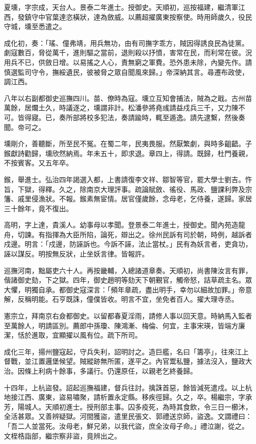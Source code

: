\begin{pinyinscope}
夏壎，字宗成，天台人。景泰二年進士。授御史。天順初，巡按福建，繼清軍江西，發鎮守中官葉達恣橫狀，達為斂威。以薦超擢廣東按察使。時用師歲久，役民守城，壎至悉遣之。

成化初，奏：「瑤、僮弗靖，用兵無功，由有司撫字乖方，賊因得誘良民為徒黨。劇寇數百，脅從萬千，進則驅之當前，退則殺以抒憤，害常在民，而利常在彼。況用兵不已，供斂日增。以易搖之人心，責無窮之軍費。恐外患未除，內變先作。請慎選監司守令，撫綏遺民，彼被脅之眾自聞風來歸。」帝深納其言。尋遷布政使，調江西。

八年以右副都御史巡撫四川。苗、僚時為寇。壎立互知會捕法，賊為之戢。古州苗萬餘，居爛土久，時議逐之，壎謂非計。松潘參將堯彧請益戍兵三千，又力陳不可。皆得寢。已，奏所部將校多犯法，奏請踰時，輒至遁逸。請先逮繫，然後奏聞。帝可之。

壎剛介，善聽斷，所至民不冤。在蜀二年，民夷畏服。然厭繁劇，與時多齟齬。子鍭獻詩勸歸，壎欣然納焉。年未五十，即求退。章四上，得請。既歸，杜門養親，不按賓客。又五年卒。

鍭，舉進士。弘治四年謁選入都，上書請復李文祥、鄒智等官，罷大學士劉吉。忤旨，下獄，得釋。久之，除南京大理評事。疏論賦斂、徭役、馬政、鹽課利弊及宗籓、戚里侵漁狀。不報。鍭素無宦情。居官僅歲餘，念母老，乞侍養，遂歸。家居三十餘年，竟不復出。

高明，字上達，貴溪人。幼事母以孝聞。登景泰二年進士，授御史。聞內苑造龍舟，切諫。有指揮為大臣所陷，論死，辯出之。徐州民訴有司於朝，時例，越訴者戍邊。明言：「戍邊，防誣訴也。今訴不誣，法止當杖。」民有為妖言者，吏貪功，誣以謀反。明按無反狀，止坐妖言律。皆報許。

巡撫河南，黜屬吏六十人。再按畿輔，入總諸道章奏。天順初，尚書陳汝言有罪，偕諸御史劾，下之獄。四年，御史趙明等劾天下朝覲官，觸帝怒，詰草疏主名。眾大懼，明獨自承。都御史寇深言：「頻年章疏，盡出明手，幸勿以細故加罪。」帝意解，反稱明能。石亨既誅，僮僕皆收。明言不宜，坐免者百人。擢大理寺丞。

憲宗立，拜南京右僉都御史。以留都春夏淫雨，請修人事以回天意。時納馬入監者至萬餘人，明請區別。薦郎中孫瓊、陳鴻漸、梅倫、何宜，主事宋瑛，皆端方廉潔，恬於進取，宜顯擢以風有位。疏下所司。

成化三年，揚州鹽寇起，守兵失利，詔明討之。造巨艦，名曰「籌亭」，往來江上督戰，並江置邏堡候望。賊縱跡無所匿，遂平之。內官鬻私鹽，據法沒入，鹽政大治。因條上利病十餘事，多議行。仍還原任，以親老乞終養歸。

十四年，上杭盜發。詔起巡撫福建，督兵往討。擒誅首惡，餘皆減死遣戍。以上杭地接江西、廣東，盜易嘯聚，請析置永定縣。移疾徑歸。久之，卒。楊繼宗，字承芳，陽城人。天順初進士。授刑部主事。囚多疫死，為時其食飲，令三日一櫛沐，全活甚眾。又善辨疑獄。河間獲盜，遣里民張文、郭禮送京師，盜逸。文謂禮曰：「吾二人並當死。汝母老，鮮兄弟，以我代盜，庶全汝母子命。」禮泣謝，從之。文桎梏詣部，繼宗察非盜，竟辨出之。


\end{pinyinscope}
